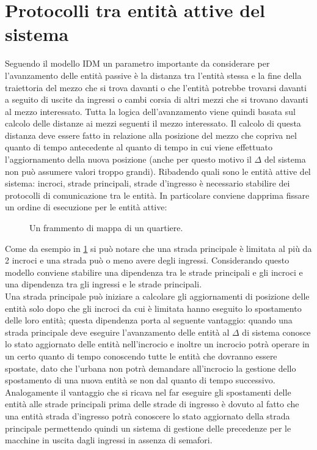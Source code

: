 \newpage
\section{Protocolli tra entità attive del sistema}
Seguendo il modello IDM un parametro importante da considerare per l'avanzamento delle entità passive è la distanza tra l'entità stessa e la fine della traiettoria del mezzo che si trova davanti o che l'entità potrebbe trovarsi davanti a seguito di uscite da ingressi o cambi corsia di altri mezzi che si trovano davanti al mezzo interessato. Tutta la logica dell'avanzamento viene quindi basata sul calcolo delle distanze ai mezzi seguenti il mezzo interessato. Il calcolo di questa distanza deve essere fatto in relazione alla posizione del mezzo che copriva nel quanto di tempo antecedente al quanto di tempo in cui viene effettuato l'aggiornamento della nuova posizione (anche per questo motivo il $\Delta$ del sistema non può assumere valori troppo grandi). Ribadendo quali sono le entità attive del sistema: incroci, strade principali, strade d'ingresso è necessario stabilire dei protocolli di comunicazione tra le entità. In particolare conviene dapprima fissare un ordine di esecuzione per le entità attive:

\begin{figure}[H] %
\caption{Un frammento di mappa di un quartiere.}
\label{fig:Un frammento di mappa di un quartiere}
\end{figure}

Come da esempio in \ref{fig:Un frammento di mappa di un quartiere} si può notare che una strada principale è limitata al più da 2 incroci e una strada può o meno avere degli ingressi. Considerando questo modello conviene stabilire una dipendenza tra le strade principali e gli incroci e una dipendenza tra gli ingressi e le strade principali. \\
Una strada principale può iniziare a calcolare gli aggiornamenti di posizione delle entità solo dopo che gli incroci da cui è limitata hanno eseguito lo spostamento delle loro entità; questa dipendenza porta al seguente vantaggio: quando una strada principale deve eseguire l'avanzamento delle entità al $\Delta$ di sistema conosce lo stato aggiornato delle entità nell'incrocio e inoltre un incrocio potrà operare in un certo quanto di tempo conoscendo tutte le entità che dovranno essere spostate, dato che l'urbana non potrà demandare all'incrocio la gestione dello spostamento di una nuova entità se non dal quanto di tempo successivo. Analogamente il vantaggio che si ricava nel far eseguire gli spostamenti delle entità alle strade principali prima delle strade di ingresso è dovuto al fatto che una entità strada d'ingresso potrà conoscere lo stato aggiornato della strada principale permettendo quindi un sistema di gestione delle precedenze per le macchine in uscita dagli ingressi in assenza di semafori.

